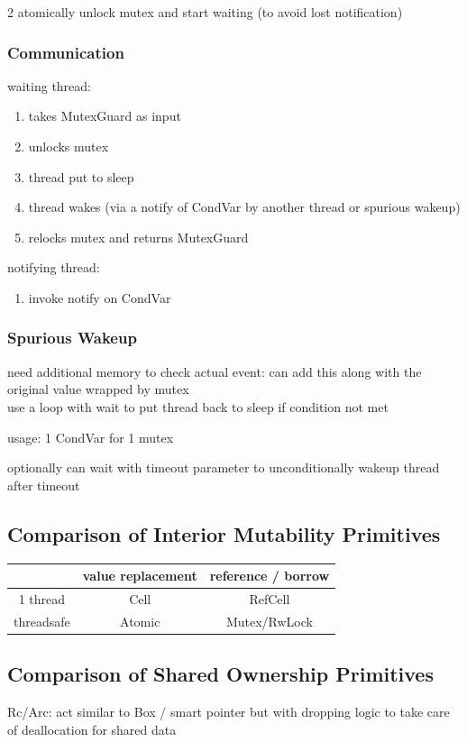 \documentclass[8pt]{extarticle}
\begin{document}
\begin{multicols*}{2}
  atomically unlock mutex and start waiting (to avoid lost notification)

  \subsubsection{Communication}
  waiting thread:
  \begin{enumerate}
  \item takes MutexGuard as input
  \item unlocks mutex
  \item thread put to sleep
  \item thread wakes (via a notify of CondVar by another thread or spurious wakeup)
  \item relocks mutex and returns MutexGuard
  \end{enumerate}
    
  notifying thread:
  \begin{enumerate}
  \item invoke notify on CondVar
  \end{enumerate}
  
  \subsubsection{Spurious Wakeup}
  need additional memory to check actual event: can add this along with the original value wrapped by mutex\\
  use a loop with wait to put thread back to sleep if condition not met
  
  usage: 1 CondVar for 1 mutex

  optionally can wait with timeout parameter to unconditionally wakeup thread after timeout

  \subsection{Comparison of Interior Mutability Primitives}
  \begin{tabular}{| c | c | c |}
    \hline
    & value replacement & reference / borrow \\
    \hline
    1  thread & Cell & RefCell \\
    \hline
    threadsafe & Atomic & Mutex/RwLock \\
    \hline
  \end{tabular}

  \subsection{Comparison of Shared Ownership Primitives}
  Rc/Arc: act similar to Box / smart pointer but with dropping logic to take care of deallocation for shared data\\
  

\end{multicols*}
\end{document}
